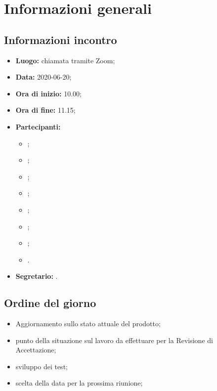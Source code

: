 \section{Informazioni generali}
\subsection{Informazioni incontro}
\begin{itemize}
	\item \textbf{Luogo:} chiamata tramite Zoom;
	\item \textbf{Data:} 2020-06-20;
	\item \textbf{Ora di inizio:} 10.00;
	\item \textbf{Ora di fine:} 11.15;
	\item \textbf{Partecipanti:}
		\begin{itemize}
			\item \VB;
			\item \LB;
			\item \NF;
			\item \EG;
			\item \FJ;
			\item \MP;
			\item \AS;
			\item \AZ.
		\end{itemize}
	\item \textbf{Segretario:} \NF.
\end{itemize}

\subsection{Ordine del giorno}
\begin{itemize}
	\item Aggiornamento sullo stato attuale del prodotto;
	\item punto della situazione sul lavoro da effettuare per la Revisione di Accettazione;
	\item sviluppo dei test;
	\item scelta della data per la prossima riunione;
\end{itemize}

